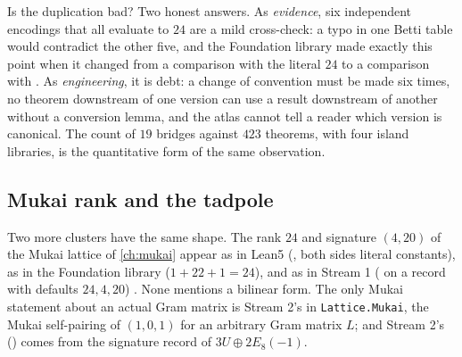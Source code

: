 Is the duplication bad? Two honest answers. As \emph{evidence}, six independent
encodings that all evaluate to $24$ are a mild cross-check: a typo in one Betti table
would contradict the other five, and the Foundation library made exactly this point when
it changed  from a comparison with the literal
$24$ to a comparison with 
. As \emph{engineering}, it is debt:
a change of convention must be made six times, no theorem downstream of one version can
use a result downstream of another without a conversion lemma, and the atlas cannot tell a
reader which version is canonical. The count of $19$ bridges against $423$ theorems, with
four island libraries, is the quantitative form of the same observation.

\subsection{Mukai rank and the tadpole}

Two more clusters have the same shape. The rank $24$ and signature $(4,20)$ of the Mukai
lattice of \cref{ch:mukai} appear as  in Lean5
(, both sides literal constants), as
 in the Foundation library ($1+22+1=24$), and as
 in Stream 1 ( on a record with
defaults $24,4,20$) . None mentions a bilinear form.
The only Mukai statement about an actual Gram matrix is Stream 2's
 in \texttt{Lattice.Mukai}, the Mukai self-pairing of
$(1,0,1)$ for an arbitrary Gram matrix $L$; and Stream 2's 
() comes from the signature record of $3U\oplus2E_8(-1)$.

